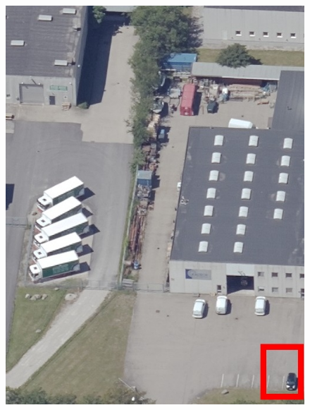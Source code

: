 \documentclass[10pt,letterpaper]{article}
\begin{document}
\begin{figure}
\begin{minipage}[b]{0.32\linewidth}
        \includegraphics[width=\textwidth]{images/copenhagen/figures/2019_84_40_5_0034_00002391_closeup1.jpg}
    \end{minipage}
    \begin{minipage}[b]{0.32\linewidth}

\end{minipage}
\end{figure}
\end{document}
